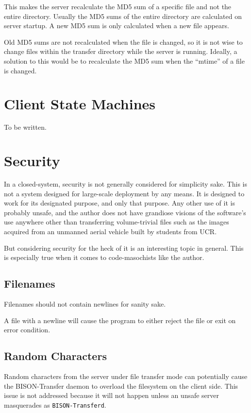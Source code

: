 \documentclass[12pt]{article}
\begin{document}
This makes the server recalculate the MD5 sum of a specific file and not the
entire directory.  Usually the MD5 sums of the entire directory are calculated
on server startup.  A new MD5 sum is only calculated when a new file appears.

Old MD5 sums are not recalculated when the file is changed, so it is not wise
to change files within the transfer directory while the server is running.
Ideally, a solution to this would be to recalculate the MD5 sum when the
``mtime'' of a file is changed.

\section{Client State Machines}
To be written.

\section{Security}
\label{sec:Security}
In a closed-system, security is not generally considered for simplicity sake.
This is not a system designed for large-scale deployment by any means.
It is designed to work for its designated purpose, and only that purpose.
Any other use of it is probably unsafe, and the author does not have grandiose
visions of the software's use anywhere other than transferring volume-trivial
files such as the images acquired from an unmanned aerial vehicle built by
students from UCR.

But considering security for the heck of it is an interesting topic in general.
This is especially true when it comes to code-masochists like the author.

\subsection{Filenames}
\label{ssec:Filenames}
Filenames should not contain newlines for sanity sake.

A file with a newline will cause the program to either reject the file or
exit on error condition.

\subsection{Random Characters}
\label{ssec:Random Characters}
Random characters from the server under file transfer mode can potentially
cause the BISON-Transfer daemon to overload the filesystem on the client side.
This issue is not addressed because it will not happen unless an unsafe server
masquerades as \verb+BISON-Transferd+.
\end{document}
